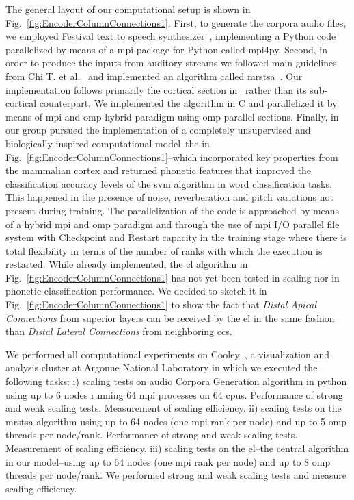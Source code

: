 {The general layout of our computational setup is shown in Fig.~\ref{fig:EncoderColumnConnections1}. First, to generate the corpora audio files, we employed Festival text to speech synthesizer~\cite{festival2014}, implementing a Python code parallelized by means of a \gls{mpi} package for Python called mpi4py. Second, in order to produce the inputs from auditory streams we followed main guidelines from Chi T. et al.~\cite{chi_2005} and implemented an algorithm called \gls{mrstsa}~\cite{10.1371/journal.pone.0217966}. Our implementation follows primarily the cortical section in~\cite{chi_2005} rather than its sub-cortical counterpart. We implemented the algorithm in C and parallelized it by means of \gls{mpi} and \gls{omp} hybrid paradigm using \gls{omp} parallel sections. Finally, in~\cite{10.1371/journal.pone.0217966} our group pursued the implementation of a completely unsupervised and biologically inspired computational model--the  in Fig.~\ref{fig:EncoderColumnConnections1}--which incorporated key properties from the mammalian cortex and returned phonetic features that improved the classification accuracy levels of the \gls{svm} algorithm in word classification tasks. This happened in the presence of noise, reverberation and pitch variations not present during training. The parallelization of the code is approached by means of a hybrid \gls{mpi} and \gls{omp} paradigm and through the use of \gls{mpi} I/O parallel file system with Checkpoint and Restart capacity in the training stage where there is total flexibility in terms of the number of ranks with which the execution is restarted. While already implemented, the \gls{cl} algorithm in Fig.~\ref{fig:EncoderColumnConnections1} has not yet been tested in scaling nor in phonetic classification performance. We decided to sketch it in Fig.~\ref{fig:EncoderColumnConnections1} to show the fact that \emph{Distal Apical Connections} from superior layers can be received by the \gls{el} in the same fashion than \emph{Distal Lateral Connections} from neighboring \glspl{cc}. 

We performed all computational experiments on Cooley~\cite{noauthor_cooley_nodate}, a visualization and analysis cluster at Argonne National Laboratory in which we executed the following tasks: i) scaling tests on audio Corpora Generation algorithm in python using up to 6 nodes running 64 \gls{mpi} processes on 64 \glspl{cpu}. Performance of strong and weak scaling tests. Measurement of scaling efficiency. ii) scaling tests on the \gls{mrstsa} algorithm using up to 64 nodes (one \gls{mpi} rank per node) and up to 5 \gls{omp} threads per node/rank. Performance of strong and weak scaling tests. Measurement of scaling efficiency. iii) scaling tests on the \gls{el}--the central algorithm in our model--using up to 64 nodes (one \gls{mpi} rank per node) and up to 8 \gls{omp} threads per node/rank. We performed strong and weak scaling tests and measure scaling efficiency. 

}
